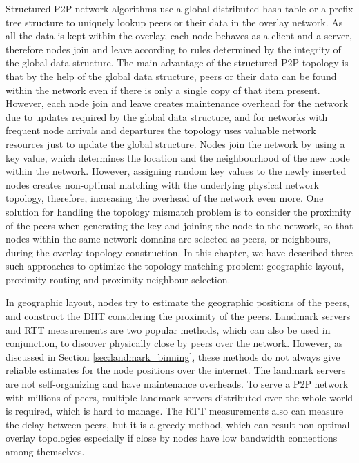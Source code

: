 \documentclass[acmcsur,acmnow]{acmtrans2m}
\begin{document}
Structured P2P network algorithms use a global distributed hash table or a
prefix tree structure to uniquely lookup peers or their data in the overlay
network. As all the data is kept within the overlay, each node behaves as a
client and a server, therefore nodes join and leave according to rules
determined by the integrity of the global data structure. The main advantage of
the structured P2P topology is that by the help of the global data structure,
peers or their data can be found within the network even if there is only a
single copy of that item present. However, each node join and leave creates
maintenance overhead for the network due to updates required by the global data
structure, and for networks with frequent node arrivals and departures the
topology uses valuable network resources just to update the global structure.
Nodes join the network by using a key value, which determines the location and
the neighbourhood of the new node within the network. However, assigning
random key values to the newly inserted nodes creates non-optimal matching with
the underlying physical network topology, therefore, increasing the overhead of
the network even more. One solution for handling the topology mismatch problem
is to consider the proximity of the peers when generating the key and joining
the node to the network, so that nodes within the same network domains are
selected as peers, or neighbours, during the overlay topology construction. In
this chapter, we have described three such approaches to optimize the topology
matching problem: geographic layout, proximity routing and proximity neighbour
selection. 

In geographic layout, nodes try to estimate the geographic positions of the
peers, and construct the DHT considering the proximity of the peers. Landmark
servers and RTT measurements are two popular methods, which can also be used in 
conjunction, to discover physically close by peers over the network. However, as
discussed in Section \ref{sec:landmark_binning}, these methods do not always
give reliable estimates for the node positions over the internet. The landmark
servers are not self-organizing and have maintenance overheads. To serve a
P2P network with millions of peers, multiple landmark servers
distributed over the whole world is required, which is hard to manage. The RTT
measurements also can measure the delay between peers, but it is a greedy method,
which can result non-optimal overlay topologies especially if close by nodes
have low bandwidth connections among themselves.
\end{document}
